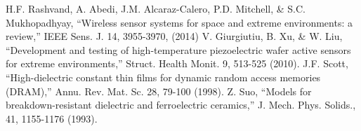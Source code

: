 \documentclass[12pt,column,showpacs,pre,preprintnumbers,amsmath,amssymb,aps,standalone]{revtex4-2}
\begin{document}
\begin{thebibliography}{10}
 H.F. Rashvand, A. Abedi, J.M. Alcaraz-Calero, P.D. Mitchell, \& S.C. Mukhopadhyay, \enquote{Wireless sensor systems for space and extreme environments: a review,} IEEE Sens. J. 14, 3955-3970, (2014)
 V. Giurgiutiu, B. Xu, \& W. Liu, \enquote{Development and testing of high-temperature piezoelectric wafer active sensors for extreme environments,} Struct. Health Monit. 9, 513-525 (2010).
 J.F. Scott, \enquote{High-dielectric constant thin films for dynamic random access memories (DRAM),} Annu. Rev. Mat. Sc. 28, 79-100 (1998).
 Z. Suo, \enquote{Models for breakdown-resistant dielectric and ferroelectric ceramics,} J. Mech. Phys. Solids., 41, 1155-1176 (1993). 
\end{thebibliography}
\end{document}
